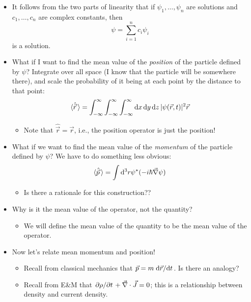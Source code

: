 \documentclass[../notes.tex]{subfiles}
\begin{document}
\begin{itemize}
    \item It follows from the two parts of linearity that if $\psi_1,\dots,\psi_n$ are solutions and $c_1,\dots,c_n$ are complex constants, then
    \begin{equation*}
        \psi = \sum_{i=1}^nc_i\psi_i
    \end{equation*}
    is a solution.
    \item What if I want to find the mean value of the \emph{position} of the particle defined by $\psi$? Integrate over all space (I know that the particle will be somewhere there), and scale the probability of it being at each point by the distance to that point:
    \begin{equation*}
        \langle{\hat{\vec{r}}}\,\rangle = \int_{-\infty}^\infty\int_{-\infty}^\infty\int_{-\infty}^\infty\dd{x}\dd{y}\dd{z}|\psi(\vec{r},t)|^2\vec{r}
    \end{equation*}
    \begin{itemize}
        \item Note that $\hat{\vec{r}}=\vec{r}$, i.e., the position operator is just the position!
    \end{itemize}
    \item What if we want to find the mean value of the \emph{momentum} of the particle defined by $\psi$? We have to do something less obvious:
    \begin{equation*}
        \langle{\hat{\vec{p}}}\,\rangle = \int\dd^3r\psi^*(-i\hbar\vec{\nabla}\psi)
    \end{equation*}
    \begin{itemize}
        \item Is there a rationale for this construction??
    \end{itemize}
    \item Why is it the mean value of the operator, not the quantity?
    \begin{itemize}
        \item We will define the mean value of the quantity to be the mean value of the operator.
    \end{itemize}
    \item Now let's relate mean momentum and position!
    \begin{itemize}
        \item Recall from classical mechanics that $\vec{p}=m\dv*{\vec{r}}{t}$. Is there an analogy?
        \item Recall from E\&M that $\pdv*{\rho}{t}+\vec{\nabla}\cdot\vec{J}=0$; this is a relationship between density and current density.

\end{itemize}
\end{itemize}
\end{document}
